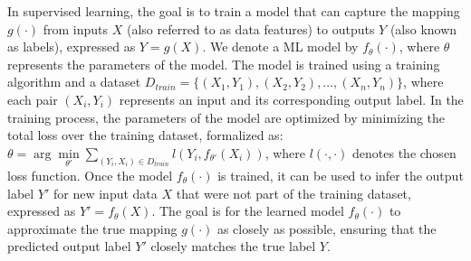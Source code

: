 \documentclass[journal]{IEEEtran}
\begin{document}




In supervised learning, the goal is to train a model that can capture the mapping $g(\cdot)$ from inputs \(X\) (also referred to as data features) to outputs \(Y\) (also known as labels), expressed as $Y=g(X)$. We denote a ML model by $f_\theta(\cdot)$, where $\theta$ represents the parameters of the model. The model is trained using a training algorithm and a dataset \(D_{train}=\{(X_1, Y_1), (X_2, Y_2), \ldots, (X_n, Y_n)\}\), where each pair \((X_i, Y_i)\) represents an input and its corresponding output label. In the training process, the parameters of the model are optimized by minimizing the total loss over the training dataset,  formalized as: \(\theta  = \arg \mathop {\min }\limits_{\theta '} \sum\nolimits_{\left( {{Y_i},{X_i}} \right) \in {D_{train}}} {l\left( {{Y_i},{f_{\theta '}}\left( {{X_i}} \right)} \right)} \), where \({l\left( {\cdot,\cdot} \right)}\) denotes the chosen loss function. Once the model \( f_\theta(\cdot) \) is trained, it can be used to infer the output label \( Y' \) for new input data \( X \) that were not part of the training dataset, expressed as \( Y' = f_\theta(X) \). The goal is for the learned model \( f_\theta(\cdot) \) to approximate the true mapping \( g(\cdot) \) as closely as possible, ensuring that the predicted output label \( Y' \) closely matches the true label \( Y \).
\end{document}
